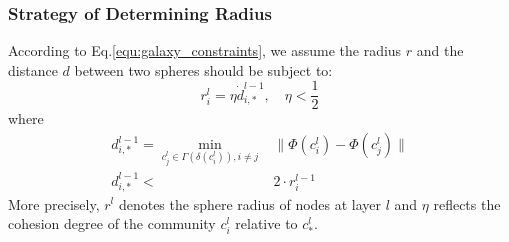 \documentclass{article}
\theoremstyle{definition}
\begin{document}
	 \subsubsection{Strategy of Determining Radius}
	 According to Eq.\ref{equ:galaxy_constraints}, we assume the radius $r$ and the distance $d$ between two spheres should be subject to:
	 \begin{equation}
	 	\label{equ:r_and_eta}
	 	r_i^l= \eta \dot d_{i, *}^{l-1}, \quad \eta < \frac{1}{2}
	 \end{equation}
	 where
 	 \begin{align}
 		\label{equ:mind}
 		d_{i,*}^{l-1} = \min_{c^{l}_j \in \Gamma(\delta(c^{l}_i)), i \neq j}& \lVert\Phi(c_i^{l}) - \Phi(c_j^{l})\rVert \\
 		\label{equ:d_and_r}
 		d_{i,*}^{l-1} <& 2 \cdot r_i^{l-1}
 	\end{align}
 	More precisely, $r^l$ denotes the sphere radius of nodes at layer $l$ and $\eta$ reflects the cohesion degree of the community $c_i^l$ relative to $c_*^l$.
\end{document}

